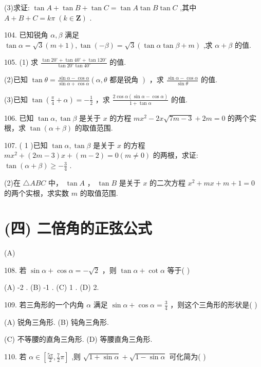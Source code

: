 \documentclass[10pt]{article}
\begin{document}
(3)求证: \(\tan A + \tan B + \tan C = \tan A\tan B\tan C\) ,其中 \(A + B + C = {k\pi }\;\left( {k \in  \mathbf{Z}}\right)\) .

104. 已知锐角 \(\alpha ,\beta\) 满足 \(\tan \alpha  = \sqrt{3}\left( {m + 1}\right) ,\tan \left( {-\beta }\right)  = \sqrt{3}\left( {\tan \alpha \tan \beta  + m}\right)\) ,求 \(\alpha  + \beta\) 的值.

105. (1) 求 \(\frac{\tan {20}^{ \circ  } + \tan {40}^{ \circ  } + \tan {120}^{ \circ  }}{\tan {20}^{ \circ  }\tan {40}^{ \circ  }}\) 的值.

(2)已知 \(\tan \theta  = \frac{\sin \alpha  - \cos \alpha }{\sin \alpha  + \cos \alpha }\left( {\alpha ,\theta \text{ 都是锐角 }}\right)\) ，求 \(\frac{\sin \alpha  - \cos \alpha }{\sin \theta }\) 的值.

(3)已知 \(\tan \left( {\frac{\pi }{4} + \alpha }\right)  =  - \frac{1}{2}\) ，求 \(\frac{2\cos \alpha \left( {\sin \alpha  - \cos \alpha }\right) }{1 + \tan \alpha }\) 的值.

106. 已知 \(\tan \alpha ,\tan \beta\) 是关于 \(x\) 的方程 \(m{x}^{2} - {2x}\sqrt{{7m} - 3} + {2m} = 0\) 的两个实根，求 \(\tan \left( {\alpha  + \beta }\right)\) 的取值范围.

107. ( 1 )已知 \(\tan \alpha ,\tan \beta\) 是关于 \(x\) 的方程 \(m{x}^{2} + \left( {{2m} - 3}\right) x + \left( {m - 2}\right)  = 0\left( {m \neq  0}\right)\) 的两根，求证: \(\tan \left( {\alpha  + \beta }\right)  \geq   - \frac{3}{4}\) .

(2)在 \(\bigtriangleup  {ABC}\) 中， \(\tan A\) ， \(\tan B\) 是关于 \(x\) 的二次方程 \({x}^{2} + {mx} + m + 1 = 0\) 的两个实根，求实数 \(m\) 的取值范围.

\section*{(四) 二倍角的正弦公式}

(A)

108. 若 \(\sin \alpha  + \cos \alpha  =  - \sqrt{2}\) ，则 \(\tan \alpha  + \cot \alpha\) 等于( )

(A) -2 . (B) -1 . (C) 1 . (D) 2.

109. 若三角形的一个内角 \(\alpha\) 满足 \(\sin \alpha  + \cos \alpha  = \frac{3}{4}\) ，则这个三角形的形状是( )

(A) 锐角三角形. (B) 钝角三角形.

(C) 不等腰的直角三角形. (D) 等腰直角三角形.

110. 若 \(\alpha  \in  \left\lbrack  {\frac{5\pi }{2},\frac{7}{2}\pi }\right\rbrack\) ,则 \(\sqrt{1 + \sin \alpha } + \sqrt{1 - \sin \alpha }\) 可化简为(   )
\end{document}
